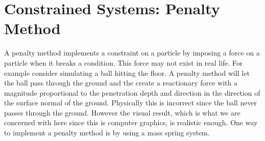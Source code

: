 \chapter{Constrained Systems: Penalty Method}
\label{Cha:PenaltyMethod}
A penalty method implements a constraint on a particle by imposing a force on a  
particle when it breaks a condition. This force may not exist in real life. For
example consider simulating a ball hitting the floor. A penalty method will let the ball
pass through the ground and the create a reactionary force with a magnitude
proportional to the penetration depth and direction in the direction of the
surface normal of the ground. Physically this is incorrect since the ball never
passes through the ground. However the visual result, which is what we are
concerned with here since this is computer graphics, is realistic enough. One
way to implement a penalty method is by using a mass spring system.
